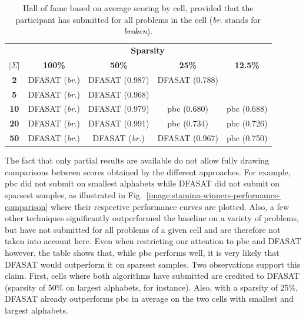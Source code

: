 \begin{table}[H]
\begin{center}
\begin{tabular}{c|c c c c}
&\multicolumn{4}{|c}{\textbf{Sparsity}}\\ 
\textbf{$|\Sigma|$} & \textbf{100\%} & \textbf{50\%} & \textbf{25\%} & \textbf{12.5\%}\\
\hline
\textbf{2}  & DFASAT (\emph{br.}) & DFASAT (0.987)      & DFASAT (0.788) &  \\
\textbf{5}  & DFASAT (\emph{br.}) & DFASAT (0.968)      &                &  \\
\textbf{10} & DFASAT (\emph{br.}) & DFASAT (0.979)      & pbc (0.680)    & pbc (0.688) \\
\textbf{20} & DFASAT (\emph{br.}) & DFASAT (0.991)      & pbc (0.734)    & pbc (0.726) \\
\textbf{50} & DFASAT (\emph{br.}) & DFASAT (\emph{br.}) & DFASAT (0.967) & pbc (0.750) \\
\end{tabular}
\end{center}
\caption{Hall of fame based on average scoring by cell, provided that the participant has submitted for all problems in the cell (\emph{br.} stands for \emph{broken}).\label{stamina:table:hall-of-fame-2}}
\end{table}

The fact that only partial results are available do not allow fully drawing comparisons between scores obtained by the different approaches. For example, pbc did not submit on smallest alphabets while DFASAT did not submit on sparsest samples, as illustrated in Fig.~\ref{image:stamina-winners-performance-comparison} where their respective performance curves are plotted. Also, a few other techniques significantly outperformed the baseline on a variety of problems, but have not submitted for all problems of a given cell and are therefore not taken into account here. Even when restricting our attention to pbc and DFASAT however, the table shows that, while pbc performs well, it is very likely that DFASAT would outperform it on sparsest samples. Two observations support this claim. First, cells where both algorithms have submitted are credited to DFASAT (sparsity of 50\% on largest alphabets, for instance). Also, with a sparsity of 25\%, DFASAT already outperforms pbc in average on the two cells with smallest and largest alphabets. 

